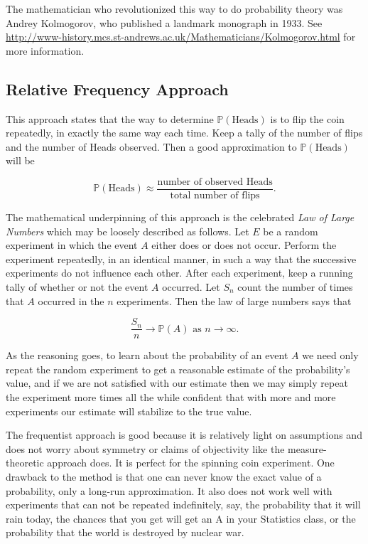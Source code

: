 \documentclass[]{book}
\numberwithin{equation}{chapter}
\numberwithin{figure}{chapter}
\theoremstyle{plain}
\theoremstyle{definition}
\theoremstyle{remark}
\theoremstyle{definition}
\theoremstyle{definition}
\theoremstyle{remark}
\begin{document}
The mathematician who revolutionized this way to do probability theory
was Andrey Kolmogorov, who published a landmark monograph in 1933. See
\url{http://www-history.mcs.st-andrews.ac.uk/Mathematicians/Kolmogorov.html}
for more information.

\subsection{Relative Frequency
Approach}\label{relative-frequency-approach}

This approach states that the way to determine
\(\mathbb{P}(\mbox{Heads})\) is to flip the coin repeatedly, in exactly
the same way each time. Keep a tally of the number of flips and the
number of Heads observed. Then a good approximation to
\(\mathbb{P}(\mbox{Heads})\) will be

\begin{equation} 
\mathbb{P}(\mbox{Heads})\approx\frac{\mbox{number of observed Heads}}{\mbox{total number of flips}}.
\end{equation}

The mathematical underpinning of this approach is the celebrated
\emph{Law of Large Numbers} which may be loosely described as follows.
Let \(E\) be a random experiment in which the event \(A\) either does or
does not occur. Perform the experiment repeatedly, in an identical
manner, in such a way that the successive experiments do not influence
each other. After each experiment, keep a running tally of whether or
not the event \(A\) occurred. Let \(S_{n}\) count the number of times
that \(A\) occurred in the \(n\) experiments. Then the law of large
numbers says that

\begin{equation}
\frac{S_{n}}{n}\to\mathbb{P}(A)\mbox{ as }n\to\infty.
\end{equation}

As the reasoning goes, to learn about the probability of an event \(A\)
we need only repeat the random experiment to get a reasonable estimate
of the probability's value, and if we are not satisfied with our
estimate then we may simply repeat the experiment more times all the
while confident that with more and more experiments our estimate will
stabilize to the true value.

The frequentist approach is good because it is relatively light on
assumptions and does not worry about symmetry or claims of objectivity
like the measure-theoretic approach does. It is perfect for the spinning
coin experiment. One drawback to the method is that one can never know
the exact value of a probability, only a long-run approximation. It also
does not work well with experiments that can not be repeated
indefinitely, say, the probability that it will rain today, the chances
that you get will get an A in your Statistics class, or the probability
that the world is destroyed by nuclear war.
\end{document}
